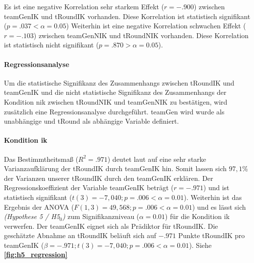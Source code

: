 \documentclass[a4paper,11pt]{article}%
\renewcommand{\\}{\vspace*{0.5\baselineskip} \newline}
\begin{document}
Es ist eine negative Korrelation sehr starkem Effekt ($r = -.900$) zwischen \ac{teamGenIK} und \ac{tRoundIK} vorhanden. Diese Korrelation ist statistisch signifikant ($p = .037 < \alpha = 0.05$)
Weiterhin ist eine negative Korrelation schwachen Effekt ($r = -.103$) zwischen \ac{teamGenNIK} und \ac{tRoundNIK} vorhanden. Diese Korrelation ist statistisch nicht signifikant ($p = .870 > \alpha = 0.05$).

		\paragraph{Regressionsanalyse}
Um die statistische Signifikanz des Zusammenhangs zwischen \ac{tRoundIK} und \ac{teamGenIK} und die nicht statistische Signifikanz des Zusammenhangs der Kondition \ac{nik} zwischen \ac{tRoundNIK} und \ac{teamGenNIK} zu bestätigen, wird zusätzlich eine Regressionsanalyse durchgeführt.
\ac{teamGen} wird wurde als unabhängige und \ac{tRound} als abhängige Variable definiert.

\paragraph{Kondition \ac{ik}}
Das Bestimmtheitsmaß ($R^{2} = .971$) deutet laut \citep{cohen2013statistical} auf eine sehr starke Varianzaufklärung der \ac{tRoundIK} durch \ac{teamGenIK} hin. Somit lassen sich $97,1\%$ der Varianzen unserer \ac{tRoundIK} durch den \ac{teamGenIK} erklären. \\
Der Regressionskoeffizient der Variable \ac{teamGenIK} beträgt ($r = -.971$) und ist statistisch signifikant ($t(3) = -7,040; p = .006 < \alpha = 0.01$). \\
Weiterhin ist das Ergebnis der ANOVA ($F(1,3) = 49,568; p = .006 < \alpha = 0.01$) und es lässt sich \textit{(Hypothese 5 / H5$_{0}$)} zum Signifikanzniveau ($\alpha = 0.01$) für die Kondition \ac{ik} verwerfen. \\
Der \ac{teamGenIK} eignet sich als Prädiktor für \ac{tRoundIK}. Die geschätzte Abnahme an \ac{tRoundIK} beläuft sich auf $-.971$ Punkte \ac{tRoundIK} pro \ac{teamGenIK} ($\beta = -.971; t(3) = -7,040; p = .006 < \alpha = 0.01$). \\
Siehe \textbf{\autoref{fig:h5_regression}}
\end{document}
